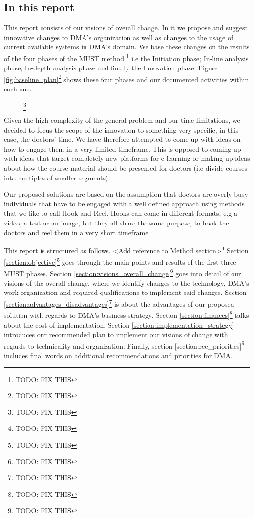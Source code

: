 \subsection{In this report}
This report consists of our visions of overall change. In it we propose and suggest innovative changes to DMA’s organization as well as changes to the usage of current available systems in DMA’s domain. We base these changes on the results of the four phases of the MUST method \cite{bodker}\footnote{TODO: FIX THIS} i.e the Initiation phase; In-line analysis phase; In-depth analysis phase and finally the Innovation phase. Figure \ref{fig:baseline_plan}\footnote{TODO: FIX THIS} shows these four phases and our documented activities within each one. 

\begin{figure}
\footnote{TODO: FIX THIS}
\end{figure}



Given the high complexity of the general problem and our time limitations, we decided to focus the scope of the innovation to something very specific, in this case, the doctors’ time. We have therefore attempted to come up with ideas on how to engage them in a very limited timeframe. This is opposed to coming up with ideas that target completely new platforms for e-learning or making up ideas about how the course material should be presented for doctors (i.e divide courses into multiples of smaller segments).

Our proposed solutions are based on the assumption that doctors are overly busy individuals that have to be engaged with a well defined approach using methods that we like to call Hook and Reel. Hooks can come in different formats, e.g a video, a test or an image, but they all share the same purpose, to hook the doctors and reel them in a very short timeframe.

This report is structured as follows. <Add reference to Method section>\footnote{TODO: FIX THIS} Section \ref{section:objective}\footnote{TODO: FIX THIS} goes through the main points and results of the first three MUST phases. Section \ref{section:visions_overall_change}\footnote{TODO: FIX THIS} goes into detail of our visions of the overall change, where we identify changes to the technology, DMA’s work organization and required qualifications to implement said changes. Section \ref{section:advantages_disadvantages}\footnote{TODO: FIX THIS} is about the advantages of our proposed solution with regards to DMA’s business strategy. Section \ref{section:finances}\footnote{TODO: FIX THIS} talks about the cost of implementation. Section \ref{section:implementation_strategy} introduces our recommended plan to implement our visions of change with regards to technicality and organization. Finally, section \ref{section:rec_priorities}\footnote{TODO: FIX THIS} includes final words on additional recommendations and priorities for DMA.

